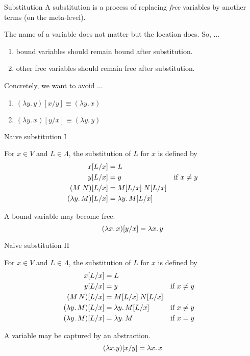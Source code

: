 \begin{frame}{Substitution}
   A \alert{substitution} is a process of replacing \emph{free} variables by
   another terms (on the meta-level). 

   The name of a variable does not matter but the location does. So, ...
   \begin{enumerate}
     \item bound variables should remain bound after substitution.
     \item other free variables should remain free after substitution.
   \end{enumerate}

   Concretely, we want to avoid ...
  \begin{enumerate}
    \item $(\lambda y.\,y)[x/y] \equiv (\lambda y.\, x)$
    \item $(\lambda y.\, x)[y/x] \equiv (\lambda y.\, y)$ 
  \end{enumerate}
   
  
\end{frame}
  
\begin{frame}{Naive substitution I}
  \begin{definition}
    For $x \in V$ and $L \in \Lambda$, the substitution of $L$ for $x$ is
    defined by
    \begin{align*}
      x[{L}/{x}] & = L \\
      y[{L}/{x}] & = y & \text{if $x \neq y$} \\
      (M\;N)[{L}/{x}]& = M[{L}/{x}] \; N[{L}/{x}] \\
      (\lambda y.\, M)[{L}/{x}] & = \lambda y.\, M [{L}/{x}]
    \end{align*}
  \end{definition}
    A bound variable may become free. 
    \[
      (\lambda x.\, x)[{y}/{x}] = \lambda x.\, y
    \]
\end{frame}
\begin{frame}{Naive substitution II}
  \begin{definition}
    For $x \in V$ and $L \in \Lambda$, the substitution
    of $L$ for $x$ is defined by
    \begin{align*}
      x[{L}/{x}] & = L \\
      y[{L}/{x}] & = y && \text{if $x \neq y$} \\
      (M\,N)[{L}/{x}] & = M[{L}/{x}]\; N[{L}/{x}] \\
      (\lambda y.\, M)[{L}/{x}] & = \lambda y.\, M[{L}/{x}] && \text{if $x \neq y$} \\
      (\lambda y.\, M)[{L}/{x}] & = \lambda y.\, M && \text{if $x = y$} 
    \end{align*}
  \end{definition}
    A variable may be captured by an abstraction. 
    \[
      (\lambda x. y)[{x}/{y}] = \lambda x.\, x
    \]
\end{frame}


